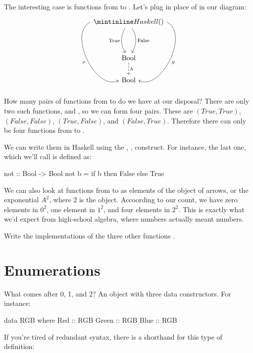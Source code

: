 \documentclass[DaoFP]{subfiles}
\begin{document}
The interesting case is functions from  to . Let's plug  in place of  in our diagram:
\[
 \begin{tikzcd}
 \hask{()}
 \arrow[dd, bend right, "\text{True}"']
 \arrow[dd, bend left, "\text{False}"]
  \arrow[ddd, bend right =90, "x"']
 \arrow[ddd, bend left=90, "y"]
\\
 \\
\text{Bool}
\arrow[d, dashed, "h"]
\\
\text{Bool}
 \end{tikzcd}
\]
How many pairs of functions from \hask{()} to  do we have at our disposal? There are only two such functions,  and , so we can form four pairs. These are $(True, True)$, $(False, False)$, $(True, False)$, and $(False, True)$. Therefore there can only be four functions from  to . 

We can write them in Haskell using the  , ,  construct. For instance, the last one, which we'll call  is defined as:
\begin{haskell}
not :: Bool -> Bool
not b = if b then False else True
\end{haskell}

We can also look at functions from  to  as elements of the object of arrows, or the exponential $A^2$, where $2$ is the  object. Accoording to our count, we have zero elements in $0^2$, one element in $1^2$, and four elements in $2^2$. This is exactly what we'd expect from high-school algebra, where numbers actually meant numbers.

\begin{exercise}
Write the implementations of the three other functions .
\end{exercise}

\section{Enumerations}

What comes after 0, 1, and 2? An object with three data constructors. For instance:
\begin{haskell}
data RGB where
  Red   :: RGB
  Green :: RGB
  Blue  :: RGB
\end{haskell}
If you're tired of redundant syntax, there is a shorthand for this type of definition:
\end{document}
